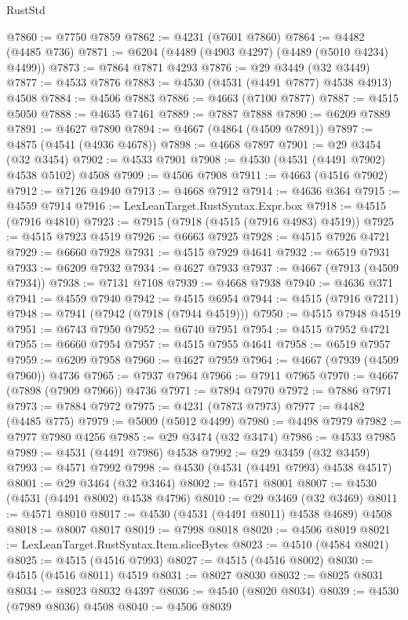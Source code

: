 \begin{lexlean}{RustStd}
\begin{coremodule}
{\begin{coremodule}
{{{{{{{{{{{{{{{{{{{{{{{{{{{{{{{{{{{{{{{{{{{{{{{{{{{{{{{@7860 := @7750 @7859
@7862 := @4231 (@7601 @7860)
@7864 := @4482 (@4485 @736)
@7871 := @6204 (@4489 (@4903 @4297) (@4489 (@5010 @4234) @4499))
@7873 := @7864 @7871 @4293
@7876 := @29 @3449 (@32 @3449)
@7877 := @4533 @7876
@7883 := @4530 (@4531 (@4491 @7877) @4538 @4913) @4508
@7884 := @4506 @7883
@7886 := @4663 (@7100 @7877)
@7887 := @4515 @5050
@7888 := @4635 @7461
@7889 := @7887 @7888
@7890 := @6209 @7889
@7891 := @4627 @7890
@7894 := @4667 (@4864 (@4509 @7891))
@7897 := @4875 (@4541 (@4936 @4678))
@7898 := @4668 @7897
@7901 := @29 @3454 (@32 @3454)
@7902 := @4533 @7901
@7908 := @4530 (@4531 (@4491 @7902) @4538 @5102) @4508
@7909 := @4506 @7908
@7911 := @4663 (@4516 @7902)
@7912 := @7126 @4940
@7913 := @4668 @7912
@7914 := @4636 @364
@7915 := @4559 @7914
@7916 := LexLeanTarget.RustSyntax.Expr.box
@7918 := @4515 (@7916 @4810)
@7923 := @7915 (@7918 (@4515 (@7916 @4983) @4519))
@7925 := @4515 @7923 @4519
@7926 := @6663 @7925
@7928 := @4515 @7926 @4721
@7929 := @6660 @7928
@7931 := @4515 @7929 @4641
@7932 := @6519 @7931
@7933 := @6209 @7932
@7934 := @4627 @7933
@7937 := @4667 (@7913 (@4509 @7934))
@7938 := @7131 @7108
@7939 := @4668 @7938
@7940 := @4636 @371
@7941 := @4559 @7940
@7942 := @4515 @6954
@7944 := @4515 (@7916 @7211)
@7948 := @7941 (@7942 (@7918 (@7944 @4519)))
@7950 := @4515 @7948 @4519
@7951 := @6743 @7950
@7952 := @6740 @7951
@7954 := @4515 @7952 @4721
@7955 := @6660 @7954
@7957 := @4515 @7955 @4641
@7958 := @6519 @7957
@7959 := @6209 @7958
@7960 := @4627 @7959
@7964 := @4667 (@7939 (@4509 @7960)) @4736
@7965 := @7937 @7964
@7966 := @7911 @7965
@7970 := @4667 (@7898 (@7909 @7966)) @4736
@7971 := @7894 @7970
@7972 := @7886 @7971
@7973 := @7884 @7972
@7975 := @4231 (@7873 @7973)
@7977 := @4482 (@4485 @775)
@7979 := @5009 (@5012 @4499)
@7980 := @4498 @7979
@7982 := @7977 @7980 @4256
@7985 := @29 @3474 (@32 @3474)
@7986 := @4533 @7985
@7989 := @4531 (@4491 @7986) @4538
@7992 := @29 @3459 (@32 @3459)
@7993 := @4571 @7992
@7998 := @4530 (@4531 (@4491 @7993) @4538 @4517)
@8001 := @29 @3464 (@32 @3464)
@8002 := @4571 @8001
@8007 := @4530 (@4531 (@4491 @8002) @4538 @4796)
@8010 := @29 @3469 (@32 @3469)
@8011 := @4571 @8010
@8017 := @4530 (@4531 (@4491 @8011) @4538 @4689) @4508
@8018 := @8007 @8017
@8019 := @7998 @8018
@8020 := @4506 @8019
@8021 := LexLeanTarget.RustSyntax.Item.sliceBytes
@8023 := @4510 (@4584 @8021)
@8025 := @4515 (@4516 @7993)
@8027 := @4515 (@4516 @8002)
@8030 := @4515 (@4516 @8011) @4519
@8031 := @8027 @8030
@8032 := @8025 @8031
@8034 := @8023 @8032 @4397
@8036 := @4540 (@8020 @8034)
@8039 := @4530 (@7989 @8036) @4508
@8040 := @4506 @8039
}}}}}}}}}}}}}}}}}}}}}}}}}}}}}}}}}}}}}}}}}}}}}}}}}}}}}}}
\end{coremodule}}
\end{coremodule}
\end{lexlean}
